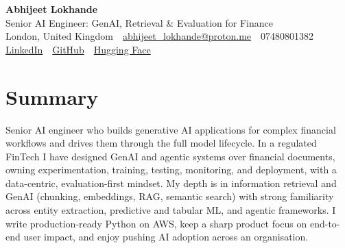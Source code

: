 \documentclass[10pt,a4paper]{article}
\newcommand{\sep}{\,\textcolor{accent!60}{\textbar}\,}
\begin{document}
\begin{center}
  {\fontsize{24}{26}\selectfont\bfseries Abhijeet Lokhande}\\[3pt]
  {\color{accent}\large Senior AI Engineer: GenAI, Retrieval \& Evaluation for Finance}\\[5pt]
  {\small
    London, United Kingdom \sep
    \href{mailto:abhijeet_lokhande@proton.me}{abhijeet\_lokhande@proton.me} \sep
    07480801382 \\[2pt]
    \href{https://www.linkedin.com/in/ablds/}{LinkedIn} \sep
    \href{https://github.com/abhijeetscode}{GitHub} \sep
    \href{https://huggingface.co/ab-ai}{Hugging Face}
  }
\end{center}
\vspace{2pt}

\section{Summary}
Senior AI engineer who builds generative AI applications for complex financial workflows and drives them through the full model lifecycle. In a regulated FinTech I have designed GenAI and agentic systems over financial documents, owning experimentation, training, testing, monitoring, and deployment, with a data-centric, evaluation-first mindset. My depth is in information retrieval and GenAI (chunking, embeddings, RAG, semantic search) with strong familiarity across entity extraction, predictive and tabular ML, and agentic frameworks. I write production-ready Python on AWS, keep a sharp product focus on end-to-end user impact, and enjoy pushing AI adoption across an organisation.

\end{document}

